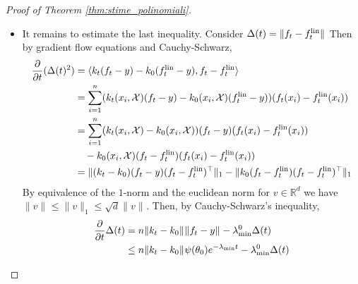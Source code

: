 \documentclass{article}
\theoremstyle{definition}
\theoremstyle{remark}
\numberwithin{equation}{section}
\newcommand{\X}{\mathcal{X}}
\newcommand{\R}{\mathbb{R}}
\newcommand{\s}{\psi}
\newcommand{\lin}{{\textup{lin}}}
\newcommand{\lammin}{\lambda_{\textup{min}}}
\newcommand{\norm}[2]{
    \|#1\|_{#2}
}
\newcommand{\partv}[1]{
    \frac{\partial}{\partial #1}
}
\begin{document}
\begin{proof}[Proof of Theorem \ref{thm:stime_polinomiali}]
\begin{itemize}
    Hence, \eqref{eqaux_flin} can be written as:
    \begin{align}
        \label{eqaux_3rdsum} \norm{f^\lin-\overline y_t}{}^2 &\le \frac{B_0}{n_1n_0}\norm{\theta_0^{(0)}\theta_0^{(1)} }{}^2 + \frac{B_1}{n_1^2n_0^2}\norm{\theta_0^{(0)}\theta_0^{(1)} }{}^2\s(\theta_0)^4t^4\\
        &\quad +\frac{B_2}{n_1^2n_0^2}\norm{\theta_0^{(0)}}{}^2\norm{\theta_0^{(1)} }{}^4\s(\theta_0)^2t^2+\frac{B_3}{n_1n_0^2}\norm{\theta_0^{(0)}\theta_0^{(1)} }{}^2\s(\theta_0)^2 t^2\\
        &\quad +\frac{B_4}{n_1^2n_0}\norm{\theta_0^{(1)} }{}^2\s(\theta_0)^4t^4+\frac{B_5}{n_1^2n_0}\norm{\theta_0^{(1)} }{}^4\s(\theta_0)^2t^2 \\
        &\quad +\frac{B_6}{n_1n_0}\norm{\theta_0^{(1)} }{}^2\s(\theta_0)^2t^2+\frac{B_7}{n_1^2n_0}\norm{\theta_0^{(0)} }{}^2\s(\theta_0)^4t^4 \\
        &\quad +\frac{B_8}{n_1^2n_0}\norm{\theta_0^{(0)} }{}^2\norm{\theta_0^{(1)} }{}^2\s(\theta_0)^2t^2+\frac{B_9}{n_1n_0}\norm{\theta_0^{(0)} }{}^2\s(\theta_0)^2t^2,
    \end{align}
    where the constants in the last inequality are, explicitly, $B_0=2A_0$,
    $B_1=8(\textup{Lip}\Phi'\norm{\X}{}\norm{x-\X}{}a_0)^2$,
    $B_2=8(\textup{Lip}\Phi'\norm{\X}{}\norm{x-\X}{}a'_0)^2$,
    $B_3=4(\textup{Lip}\Phi'\norm{\X}{}\norm{x-\X}{}a_1)^2$,
    $B_4=8(\norm{\Phi'}{\infty}\norm{x-\X}{}a_0)^2$,
    $B_5=8(\norm{\Phi'}{\infty}\norm{x-\X}{}a'_0)^2$,
    $B_6=4(\norm{\Phi'}{\infty}\norm{x-\X}{}a_1)^2$,
    $B_7=4A_0a_0^2$,
    $B_8=4A_0{a'}_0^2$, and $B_9 = 2A_0a_1^2$.

    \item It remains to estimate the last inequality.
        Consider $\Delta(t) = \norm{f_t - f_t^\lin}{}$
        Then by gradient flow equations and Cauchy-Schwarz,
        \begin{align}
            \partv{t}(\Delta(t)^2) & = \langle k_t(f_t-y) -k_0(f_t^\lin-y), f_t - f_t^\lin \rangle \\
            &= \sum_{i=1}^n (k_t(x_i,\X)(f_t-y) -k_0(x_i,\X)(f_t^\lin-y))(f_t(x_i) - f_t^\lin(x_i))\\
            &= \sum_{i=1}^n (k_t(x_i,\X)-k_0(x_i,\X))(f_t-y)(f_t(x_i) - f_t^\lin(x_i)) \\
            &\quad -k_0(x_i,\X)(f_t - f_t^\lin)(f_t(x_i) - f_t^\lin(x_i))\\
            &=\norm{(k_t-k_0)(f_t-y)(f_t-f_t^\lin)^\top}{1} - \norm{k_0(f_t-f_t^\lin)(f_t-f_t^\lin)^\top}{1}
        \end{align}
        By equivalence of the $1$-norm and the euclidean norm for $v\in \R^d$ we have $\norm{v}{} \le \norm{v}{1} \le \sqrt{d}\norm{v}{}$.
        Then, by Cauchy-Schwarz's inequality,
        \begin{align}
            \frac{\partial}{\partial t} \Delta(t) &= n\norm{k_t-k_0}{}\norm{f_t-y}{} -\lammin^0\Delta(t) \\
            &\label{eqaux_delta} \le n\norm{k_t-k_0}{}\s(\theta_0)e^{-\lammin t} -\lammin^0\Delta(t)
        \end{align}


\end{itemize}
\end{proof}
\end{document}
